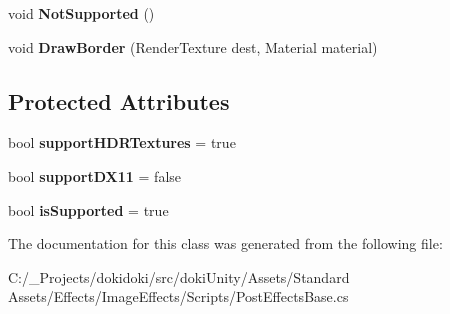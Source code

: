 \begin{DoxyCompactItemize}
\item 
void {\bfseries Not\+Supported} ()\hypertarget{class_unity_standard_assets_1_1_image_effects_1_1_post_effects_base_a57dc8025f94e36483c53b482cd289d99}{}\label{class_unity_standard_assets_1_1_image_effects_1_1_post_effects_base_a57dc8025f94e36483c53b482cd289d99}

\item 
void {\bfseries Draw\+Border} (Render\+Texture dest, Material material)\hypertarget{class_unity_standard_assets_1_1_image_effects_1_1_post_effects_base_a111dac8859a0c49146813131057b9630}{}\label{class_unity_standard_assets_1_1_image_effects_1_1_post_effects_base_a111dac8859a0c49146813131057b9630}

\end{DoxyCompactItemize}
\subsection*{Protected Attributes}
\begin{DoxyCompactItemize}
\item 
bool {\bfseries support\+H\+D\+R\+Textures} = true\hypertarget{class_unity_standard_assets_1_1_image_effects_1_1_post_effects_base_afe07c7112eeb27534eabb78239ef7613}{}\label{class_unity_standard_assets_1_1_image_effects_1_1_post_effects_base_afe07c7112eeb27534eabb78239ef7613}

\item 
bool {\bfseries support\+D\+X11} = false\hypertarget{class_unity_standard_assets_1_1_image_effects_1_1_post_effects_base_ac75c4f2bba947de476c75a262822a24c}{}\label{class_unity_standard_assets_1_1_image_effects_1_1_post_effects_base_ac75c4f2bba947de476c75a262822a24c}

\item 
bool {\bfseries is\+Supported} = true\hypertarget{class_unity_standard_assets_1_1_image_effects_1_1_post_effects_base_a5084bc03b21b083a1ef01a9cbb5c1f37}{}\label{class_unity_standard_assets_1_1_image_effects_1_1_post_effects_base_a5084bc03b21b083a1ef01a9cbb5c1f37}

\end{DoxyCompactItemize}


The documentation for this class was generated from the following file\+:\begin{DoxyCompactItemize}
\item 
C\+:/\+\_\+\+Projects/dokidoki/src/doki\+Unity/\+Assets/\+Standard Assets/\+Effects/\+Image\+Effects/\+Scripts/Post\+Effects\+Base.\+cs\end{DoxyCompactItemize}
